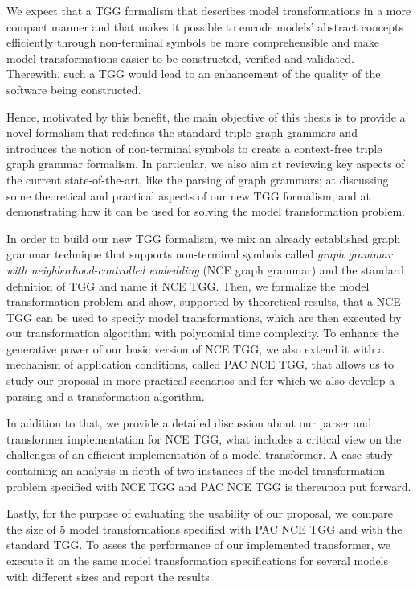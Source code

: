 We expect that a TGG formalism that describes model transformations in a more compact manner and that makes it possible to encode models' abstract concepts efficiently through non-terminal symbols be more comprehensible and make model transformations easier to be constructed, verified and validated. Therewith, such a TGG would lead to an enhancement of the quality of the software being constructed.

Hence, motivated by this benefit, the main objective of this thesis is to provide a novel formalism that redefines the standard triple graph grammars and introduces the notion of non-terminal symbols to create a context-free triple graph grammar formalism. In particular, we also aim at reviewing key aspects of the current state-of-the-art, like the parsing of graph grammars; at discussing some theoretical and practical aspects of our new TGG formalism; and at demonstrating how it can be used for solving the model transformation problem.

In order to build our new TGG formalism, we mix an already established graph grammar technique that supports non-terminal symbols called \emph{graph grammar with neighborhood-controlled embedding} (NCE graph grammar) \cite{janssens1982graph} and the standard definition of TGG \cite{schurr1994specification} and name it NCE TGG. Then, we formalize the model transformation problem and show, supported by theoretical results, that a NCE TGG can be used to specify model transformations, which are then executed by our transformation algorithm with polynomial time complexity. To enhance the generative power of our basic version of NCE TGG, we also extend it with a mechanism of application conditions, called PAC NCE TGG, that allows us to study our proposal in more practical scenarios and for which we also develop a parsing and a transformation algorithm.

In addition to that, we provide a detailed discussion about our parser and transformer implementation for NCE TGG, what includes a critical view on the challenges of an efficient implementation of a model transformer. A case study containing an analysis in depth of two instances of the model transformation problem specified with NCE TGG and PAC NCE TGG is thereupon put forward.

Lastly, for the purpose of evaluating the usability of our proposal, we compare the size of 5 model transformations specified with PAC NCE TGG and with the standard TGG. To asses the performance of our implemented transformer, we execute it on the same model transformation specifications for several models with different sizes and report the results.

